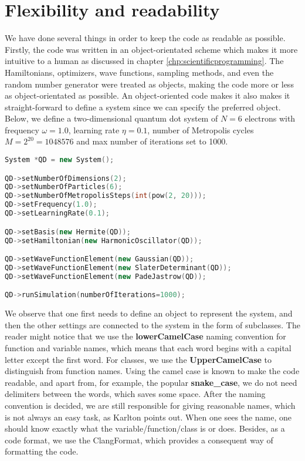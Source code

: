 \section{Flexibility and readability}
We have done several things in order to keep the code as readable as possible. Firstly, the code was written in an object-orientated scheme which makes it more intuitive to a human as discussed in chapter \ref{chp:scientificprogramming}. The Hamiltonians, optimizers, wave functions, sampling methods, and even the random number generator were treated as objects, making the code more or less as object-orientated as possible. An object-oriented code makes it also makes it straight-forward to define a system since we can specify the preferred object. Below, we define a two-dimensional quantum dot system of $N=6$ electrons with frequency $\omega=1.0$, learning rate $\eta=0.1$, number of Metropolis cycles $M=2^{20}=1048576$ and max number of iterations set to 1000.

\begin{lstlisting}[language={C++}, caption={Example on how a quantum dot system can be initialized.}, label={lst:qd}]
System *QD = new System();

QD->setNumberOfDimensions(2);
QD->setNumberOfParticles(6);
QD->setNumberOfMetropolisSteps(int(pow(2, 20)));
QD->setFrequency(1.0);
QD->setLearningRate(0.1);

QD->setBasis(new Hermite(QD));
QD->setHamiltonian(new HarmonicOscillator(QD));

QD->setWaveFunctionElement(new Gaussian(QD));
QD->setWaveFunctionElement(new SlaterDeterminant(QD));
QD->setWaveFunctionElement(new PadeJastrow(QD));

QD->runSimulation(numberOfIterations=1000);
\end{lstlisting}
We observe that one first needs to define an object to represent the system, and then the other settings are connected to the system in the form of subclasses. The reader might notice that we use the \textbf{lowerCamelCase} naming convention for function and variable names, which means that each word begins with a capital letter except the first word. For classes, we use the \textbf{UpperCamelCase} to distinguish from function names. Using the camel case is known to make the code readable, and apart from, for example, the popular \textbf{snake\_case}, we do not need delimiters between the words, which saves some space. After the naming convention is decided, we are still responsible for giving reasonable names, which is not always an easy task, as Karlton points out. When one sees the name, one should know exactly what the variable/function/class is or does. Besides, as a code format, we use the ClangFormat, which provides a consequent way of formatting the code. 


